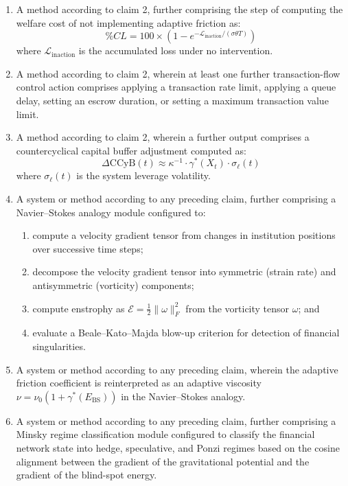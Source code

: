 \documentclass[12pt,a4paper]{article}
\begin{document}
\begin{enumerate}[label=\textbf{\arabic*.}]
\item A method according to claim 2, further comprising the step of 
computing the welfare cost of not implementing adaptive friction as:
\[
\%CL = 100 \times \left(1 - e^{-\mathcal{L}_{\text{inaction}} / 
(\sigma\theta T)}\right)
\]
where $\mathcal{L}_{\text{inaction}}$ is the accumulated loss under no 
intervention.

\item A method according to claim 2, wherein at least one further 
transaction-flow control action comprises applying a transaction rate limit, 
applying a queue delay, setting an escrow duration, or setting a maximum 
transaction value limit.

\item A method according to claim 2, wherein a further output comprises a 
countercyclical capital buffer adjustment computed as:
\[
\Delta\text{CCyB}(t) \approx \kappa^{-1} \cdot \gamma^*(X_t) \cdot 
\sigma_\ell(t)
\]
where $\sigma_\ell(t)$ is the system leverage volatility.

\item A system or method according to any preceding claim, further 
comprising a Navier--Stokes analogy module configured to:
\begin{enumerate}[label=(\roman*)]
\item compute a velocity gradient tensor from changes in institution 
positions over successive time steps;
\item decompose the velocity gradient tensor into symmetric (strain rate) 
and antisymmetric (vorticity) components;
\item compute enstrophy as $\mathcal{E} = \frac{1}{2}\|\omega\|_F^2$ from 
the vorticity tensor $\omega$; and
\item evaluate a Beale--Kato--Majda blow-up criterion for detection of 
financial singularities.
\end{enumerate}

\item A system or method according to any preceding claim, wherein the 
adaptive friction coefficient is reinterpreted as an adaptive viscosity 
$\nu = \nu_0(1 + \gamma^*(E_{\text{BS}}))$ in the Navier--Stokes analogy.

\item A system or method according to any preceding claim, further 
comprising a Minsky regime classification module configured to classify 
the financial network state into hedge, speculative, and Ponzi regimes 
based on the cosine alignment between the gradient of the gravitational 
potential and the gradient of the blind-spot energy.


\end{enumerate}
\end{document}
